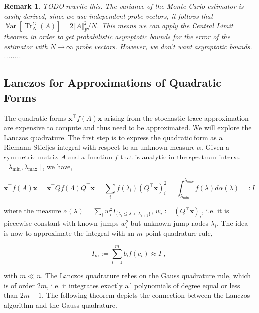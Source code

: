 \documentclass{article}
\newcommand{\vect}[1]{\boldsymbol{\mathbf{#1}}}
\newcommand{\norm}[1]{\Vert #1 \Vert}
\DeclareMathOperator{\trace}{Tr}
\DeclareMathOperator{\Var}{\mathbb{V}ar}
\newtheorem*{remark}{Remark}
\begin{document}
\begin{remark}
TODO rewrite this. The variance of the Monte Carlo estimator is easily derived, since we use independent probe vectors, it follows that $\Var[\trace_N^G(A)] = 2 \norm{A}_F^2/ N$. 
This means we can apply the Central Limit theorem in order to get probabilistic asymptotic bounds for the error of the estimator with $N \to \infty$ probe vectors. However, we don't want asymptotic bounds. ........
\end{remark}


\subsection{Lanczos for Approximations of Quadratic Forms} \label{sec:lanczos_quadrature}


The quadratic forms $\vect x^\top f(A) \vect x$ arising from the stochastic trace approximation are expensive to compute and thus need to be approximated. We will explore the Lanczos quadrature. The first step is to express the quadratic form as a Riemann-Stieljes integral with respect to an unknown measure $\alpha$. Given a symmetric matrix $A$ and a function $f$ that is analytic in the spectrum interval $[\lambda_{\min}, \lambda_{\max}]$, we have,

\begin{equation*}
    \vect x^\top f(A) \vect x = \vect x^\top Q f(\Lambda) Q^\top \vect x = \sum_i f(\lambda_i) (Q^\top \vect x)_i^2 = \int_{\lambda_{\min}}^{\lambda_{\max}} f(\lambda) d \alpha(\lambda) =: I
\end{equation*}

where the measure $\alpha(\lambda) = \sum_i w_i^2 I_{\{\lambda_i \le \lambda < \lambda_{i+1}\}}$, $w_i := (Q^\top \vect x)_i$, i.e. it is piecewise constant with known jumps $w_i^2$ but unknown jump nodes $\lambda_i$. The idea is now to approximate the integral with an $m$-point quadrature rule,

\begin{equation} \label{eq:gauss_quadrature}
    I_m := \sum_{i=1}^m b_i f(c_i) \approx I \; ,
\end{equation}

with $m \ll n$. The Lanczos quadrature relies on the Gauss quadrature rule, which is of order $2m$, i.e. it integrates exactly all polynomials of degree equal or less than $2m -1$. The following theorem depicts the connection between the Lanczos algorithm and the Gauss quadrature.
\end{document}
